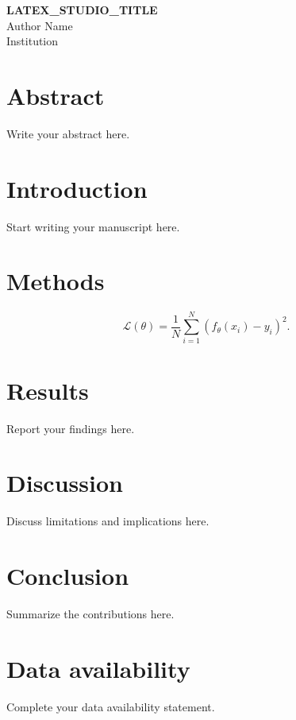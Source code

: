 \documentclass[10pt,letterpaper]{article}
\begin{document}
\begin{flushleft}
{\Large\textbf{LATEX_STUDIO_TITLE}}\\
Author Name\\
Institution\\
\end{flushleft}
\section*{Abstract}
Write your abstract here.

\section{Introduction}
Start writing your manuscript here.

\section{Methods}
\begin{equation}
  \mathcal{L}(\theta) = \frac{1}{N}\sum_{i=1}^{N}(f_\theta(x_i)-y_i)^2.
  \label{eq:objective}
\end{equation}

\section{Results}
Report your findings here.

\section{Discussion}
Discuss limitations and implications here.

\section{Conclusion}
Summarize the contributions here.

\section*{Data availability}
Complete your data availability statement.
% 
\end{document}
